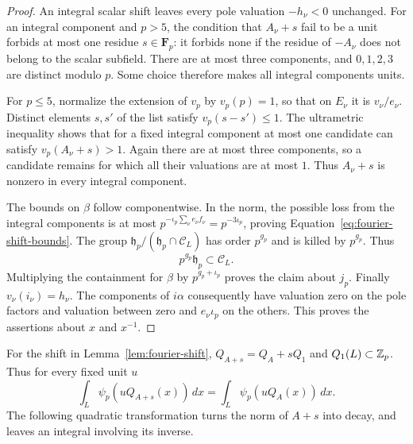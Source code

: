 \begin{proof}
An integral scalar shift leaves every pole valuation $-h_\nu<0$ unchanged.
For an integral component and $p>5$, the condition that $A_\nu+s$ fail to be
a unit forbids at most one residue $s\in\mathbf F_p$: it forbids none if
the residue of $-A_\nu$ does not belong to the scalar subfield.  There are
at most three components, and $0,1,2,3$ are distinct modulo $p$.  Some choice
therefore makes all integral components units.

For $p\le5$, normalize the extension of $v_p$ by $v_p(p)=1$, so that on
$E_\nu$ it is $v_\nu/e_\nu$.  Distinct elements $s,s'$ of the list satisfy
$v_p(s-s')\le1$.  The ultrametric inequality shows that for a fixed integral
component at most one candidate can satisfy $v_p(A_\nu+s)>1$.  Again there
are at most three components, so a candidate remains for which all their
valuations are at most $1$.  Thus $A_\nu+s$ is nonzero in every integral
component.

The bounds on $\beta$ follow componentwise.  In the norm, the possible
loss from the integral components is at most
$p^{-\iota_p\sum_\nu e_\nu f_\nu}=p^{-3\iota_p}$, proving
Equation~\eqref{eq:fourier-shift-bounds}.  The group
$\mathfrak h_p/(\mathfrak h_p\cap\mathcal C_L)$ has order $p^{g_p}$ and is
killed by $p^{g_p}$.  Thus
\begin{equation}\label{eq:fourier-order-containment}
 p^{g_p}\mathfrak h_p\subset\mathcal C_L.
\end{equation}
Multiplying the containment for $\beta$ by $p^{g_p+\iota_p}$ proves the
claim about $j_p$.  Finally $v_\nu(i_\nu)=h_\nu$.  The components of
$i\alpha$ consequently have valuation zero on the pole factors and valuation
between zero and $e_\nu\iota_p$ on the others.  This proves the assertions
about $x$ and $x^{-1}$.
\end{proof}

For the shift in Lemma~\ref{lem:fourier-shift},
$Q_{A+s}=Q_A+sQ_1$ and $Q_1(L)\subset\mathbb Z_p$.  Thus for every fixed unit $u$
\begin{equation}\label{eq:fourier-scalar-shift-invariance}
 \int_L\psi_p(uQ_{A+s}(x))\,dx
       =\int_L\psi_p(uQ_A(x))\,dx.
\end{equation}
The following quadratic transformation turns the norm of $A+s$ into decay,
and leaves an integral involving its inverse.

